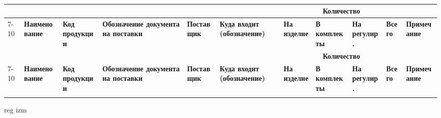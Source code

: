 \documentclass[a3paper,russian,utf8]{eskdgraph}
\begin{document}
\renewcommand{\tablename}{}
\setlength{\extrarowheight}{0,24cm} 

  \newcommand{\ltheadEquipment}{}
  \renewcommand{\ltheadEquipment}
    {
    \hline    
     &&&&&& \multicolumn{4}{c|}{\centering \textbf{Количество}}&\\
    \cline{7-10}
    \multicolumn{1}{|m{1cm}|}{\centering  \textbf{№ стр.}}&
    \multicolumn{1}{m{6cm}|}{\centering   \textbf{Наименование}}&
    \multicolumn{1}{m{3cm}|}{\centering  \textbf{Код продукции}}&
    \multicolumn{1}{m{5cm}|}{\centering   \textbf{Обозначение документа на поставки}}&
    \multicolumn{1}{m{4cm}|}{\centering   \textbf{Поставщик}}& 
    \multicolumn{1}{m{6cm}|}{\centering   \textbf{Куда входит (обозначение)}}& 
    \multicolumn{1}{m{1,6cm}|}{\centering   \textbf{На изделие}}& 
    \multicolumn{1}{m{1,6cm}|}{\centering   \textbf{В комплекты}}&
    \multicolumn{1}{m{1,6cm}|}{\centering   \textbf{На регулир.}}&
    \multicolumn{1}{m{1,6cm}|}{\centering   \textbf{Всего}}&
    \multicolumn{1}{m{2,4cm}|}{\centering   \textbf{Примечание}}\\
    \hline
    }    
\begin{longtable} {|m{1cm}|m{6cm}|m{3cm}|m{5cm}|m{4cm}|m{6cm}|m{}|m{}|m{}|m{}|m{}|}
\caption{}
\label{tab:psitible}
\\
    \ltheadEquipment
    \endfirsthead 
    \ltheadEquipment
    \endhead
    \endfoot
    \endlastfoot

\end{longtable}

{
\newpage


reg izm
}
\end{document}
